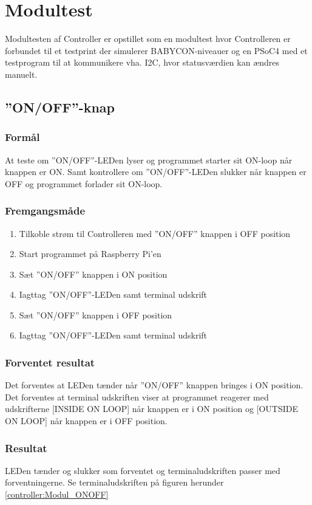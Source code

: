 \section{Modultest}

Modultesten af Controller er opstillet som en modultest hvor Controlleren er forbundet til et testprint der simulerer BABYCON-niveauer og en PSoC4 med et testprogram til at kommunikere vha. I2C, hvor statusværdien kan ændres manuelt.

\subsection*{''ON/OFF''-knap}

\subsubsection*{Formål}

At teste om ''ON/OFF''-LEDen lyser og programmet starter sit ON-loop når knappen er ON. Samt kontrollere om ''ON/OFF''-LEDen slukker når knappen er OFF og programmet forlader sit ON-loop.

\subsubsection*{Fremgangsmåde}
\begin{enumerate}
\item Tilkoble strøm til Controlleren med ''ON/OFF'' knappen i OFF position
\item Start programmet på Raspberry Pi'en
\item Sæt ''ON/OFF'' knappen i ON position
\item Iagttag ''ON/OFF''-LEDen samt terminal udskrift
\item Sæt ''ON/OFF'' knappen i OFF position
\item Iagttag ''ON/OFF''-LEDen samt terminal udskrift
\end{enumerate}

\subsubsection*{Forventet resultat} 
Det forventes at LEDen tænder når ''ON/OFF'' knappen bringes i ON position. Det forventes at terminal udskriften viser at programmet reagerer med udskrifterne [INSIDE ON LOOP] når knappen er i ON position og [OUTSIDE ON LOOP] når knappen er i OFF position.

\subsubsection*{Resultat} 
LEDen tænder og slukker som forventet og terminaludskriften passer med forventningerne. Se terminaludskriften på figuren herunder \ref{controller:Modul_ONOFF}

